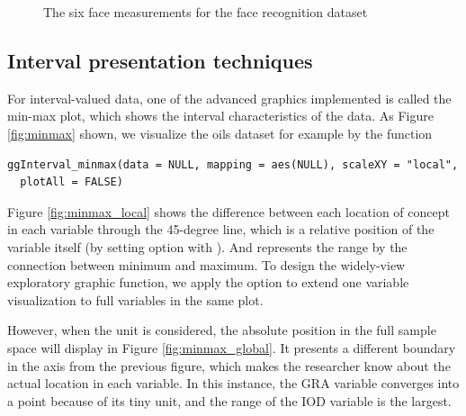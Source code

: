\documentclass[article]{jss}
\begin{document}
\begin{figure}[htbp]
\centering
{}
\caption{\label{fig:face} The six face measurements for the face recognition dataset}
\end{figure}


\subsection{Interval presentation techniques}

For interval-valued data, one of the advanced graphics implemented is called the min-max plot, which shows the interval characteristics of the data. As Figure \ref{fig:minmax} shown, we visualize the oils dataset for example by the function 

\begin{verbatim}
ggInterval_minmax(data = NULL, mapping = aes(NULL), scaleXY = "local",
  plotAll = FALSE)
\end{verbatim}


Figure \ref{fig:minmax_local} shows the difference between each location of concept in each variable through the 45-degree line, which is a relative position of the variable itself (by setting option  with ). And represents the range by the connection between minimum and maximum. To design the widely-view exploratory graphic function, we apply the option  to extend one variable visualization to full variables in the same plot.

However, when the unit is considered, the absolute position in the full sample space will display in Figure \ref{fig:minmax_global}. It presents a different boundary in the axis from the previous figure, which makes the researcher know about the actual location in each variable. In this instance, the GRA variable converges into a point because of its tiny unit, and the range of the IOD variable is the largest.
\end{document}
